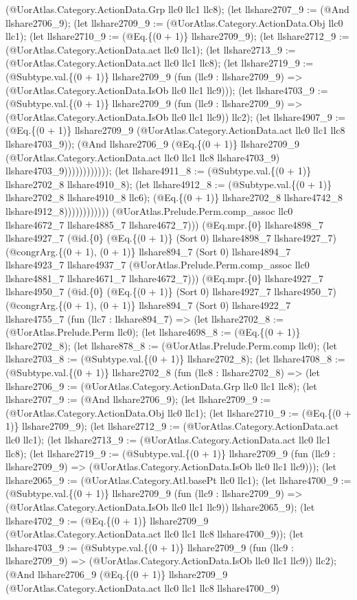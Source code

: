 \documentclass[11pt]{article}
\begin{document}
(@UorAtlas.Category.ActionData.Grp llc0 llc1 llc8); (let llshare2707\_9 := (@And llshare2706\_9); (let llshare2709\_9 := (@UorAtlas.Category.ActionData.Obj llc0 llc1); (let llshare2710\_9 := (@Eq.\{(0 + 1)\} llshare2709\_9); (let llshare2712\_9 := (@UorAtlas.Category.ActionData.act llc0 llc1); (let llshare2713\_9 := (@UorAtlas.Category.ActionData.act llc0 llc1 llc8); (let llshare2719\_9 := (@Subtype.val.\{(0 + 1)\} llshare2709\_9 (fun (llc9 : llshare2709\_9) => (@UorAtlas.Category.ActionData.IsOb llc0 llc1 llc9))); (let llshare4703\_9 := (@Subtype.val.\{(0 + 1)\} llshare2709\_9 (fun (llc9 : llshare2709\_9) => (@UorAtlas.Category.ActionData.IsOb llc0 llc1 llc9)) llc2); (let llshare4907\_9 := (@Eq.\{(0 + 1)\} llshare2709\_9 (@UorAtlas.Category.ActionData.act llc0 llc1 llc8 llshare4703\_9)); (@And llshare2706\_9 (@Eq.\{(0 + 1)\} llshare2709\_9 (@UorAtlas.Category.ActionData.act llc0 llc1 llc8 llshare4703\_9) llshare4703\_9)))))))))))); (let llshare4911\_8 := (@Subtype.val.\{(0 + 1)\} llshare2702\_8 llshare4910\_8); (let llshare4912\_8 := (@Subtype.val.\{(0 + 1)\} llshare2702\_8 llshare4910\_8 llc6); (@Eq.\{(0 + 1)\} llshare2702\_8 llshare4742\_8 llshare4912\_8)))))))))))) (@UorAtlas.Prelude.Perm.comp\_assoc llc0 llshare4672\_7 llshare4885\_7 llshare4672\_7))) (@Eq.mpr.\{0\} llshare4898\_7 llshare4927\_7 (@id.\{0\} (@Eq.\{(0 + 1)\} (Sort 0) llshare4898\_7 llshare4927\_7) (@congrArg.\{(0 + 1), (0 + 1)\} llshare894\_7 (Sort 0) llshare4894\_7 llshare4923\_7 llshare4937\_7 (@UorAtlas.Prelude.Perm.comp\_assoc llc0 llshare4881\_7 llshare4671\_7 llshare4672\_7))) (@Eq.mpr.\{0\} llshare4927\_7 llshare4950\_7 (@id.\{0\} (@Eq.\{(0 + 1)\} (Sort 0) llshare4927\_7 llshare4950\_7) (@congrArg.\{(0 + 1), (0 + 1)\} llshare894\_7 (Sort 0) llshare4922\_7 llshare4755\_7 (fun (llc7 : llshare894\_7) => (let llshare2702\_8 := (@UorAtlas.Prelude.Perm llc0); (let llshare4698\_8 := (@Eq.\{(0 + 1)\} llshare2702\_8); (let llshare878\_8 := (@UorAtlas.Prelude.Perm.comp llc0); (let llshare2703\_8 := (@Subtype.val.\{(0 + 1)\} llshare2702\_8); (let llshare4708\_8 := (@Subtype.val.\{(0 + 1)\} llshare2702\_8 (fun (llc8 : llshare2702\_8) => (let llshare2706\_9 := (@UorAtlas.Category.ActionData.Grp llc0 llc1 llc8); (let llshare2707\_9 := (@And llshare2706\_9); (let llshare2709\_9 := (@UorAtlas.Category.ActionData.Obj llc0 llc1); (let llshare2710\_9 := (@Eq.\{(0 + 1)\} llshare2709\_9); (let llshare2712\_9 := (@UorAtlas.Category.ActionData.act llc0 llc1); (let llshare2713\_9 := (@UorAtlas.Category.ActionData.act llc0 llc1 llc8); (let llshare2719\_9 := (@Subtype.val.\{(0 + 1)\} llshare2709\_9 (fun (llc9 : llshare2709\_9) => (@UorAtlas.Category.ActionData.IsOb llc0 llc1 llc9))); (let llshare2065\_9 := (@UorAtlas.Category.Atl.basePt llc0 llc1); (let llshare4700\_9 := (@Subtype.val.\{(0 + 1)\} llshare2709\_9 (fun (llc9 : llshare2709\_9) => (@UorAtlas.Category.ActionData.IsOb llc0 llc1 llc9)) llshare2065\_9); (let llshare4702\_9 := (@Eq.\{(0 + 1)\} llshare2709\_9 (@UorAtlas.Category.ActionData.act llc0 llc1 llc8 llshare4700\_9)); (let llshare4703\_9 := (@Subtype.val.\{(0 + 1)\} llshare2709\_9 (fun (llc9 : llshare2709\_9) => (@UorAtlas.Category.ActionData.IsOb llc0 llc1 llc9)) llc2); (@And llshare2706\_9 (@Eq.\{(0 + 1)\} llshare2709\_9 (@UorAtlas.Category.ActionData.act llc0 llc1 llc8 llshare4700\_9) 
\end{document}
